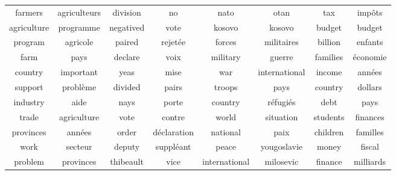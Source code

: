 \documentclass{article}
\begin{document}
\setlength{\textfloatsep}{9pt}
\begin{table*} 
\centering 
\begin{tabular}{cc|cc|cc|cc} 
              farmers &         agriculteurs &              division &                   no &                  nato &                 otan &                   tax &              imp\^ots  \\ 
           agriculture &            programme &             negatived &                 vote &                kosovo &               kosovo &                budget &               budget  \\ 
               program &             agricole &                paired &             rejet\'ee &                forces &           militaires &               billion &              enfants  \\ 
                  farm &                 pays &               declare &                 voix &              military &               guerre &              families &            \'economie  \\ 
               country &            important &                  yeas &                 mise &                   war &        international &                income &              ann\'ees  \\ 
               support &            probl\`eme &               divided &             pairs &                troops &                 pays &               country &              dollars  \\ 
              industry &                 aide &                  nays &                porte &               country &           r\'efugi\'es &                  debt &                 pays  \\ 
                 trade &          agriculture &                  vote &               contre &                 world &            situation &              students &             finances  \\ 
             provinces &              ann\'ees &                 order &         d\'eclaration &              national &                 paix &              children &             familles  \\ 
                  work &              secteur &                deputy &           suppl\'eant &                 peace &          yougoslavie &                 money &               fiscal  \\ 
               problem &            provinces &             thibeault &                 vice &         international &            milosevic &               finance &            milliards  \\ 

\end{tabular}
\end{table*}
\end{document}
